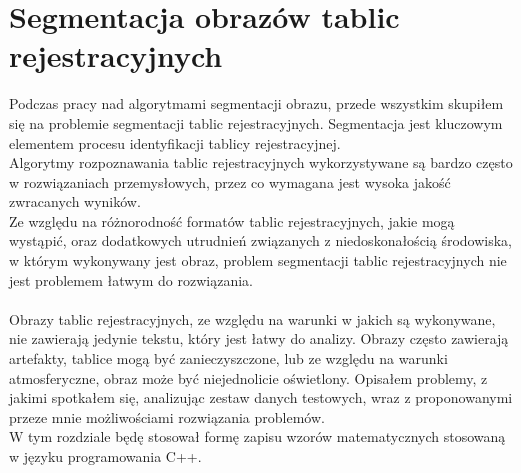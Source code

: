 \section{Segmentacja obrazów tablic rejestracyjnych}
Podczas pracy nad algorytmami segmentacji obrazu, przede wszystkim skupiłem się na problemie segmentacji tablic rejestracyjnych. Segmentacja jest kluczowym elementem procesu identyfikacji tablicy rejestracyjnej.\\
Algorytmy rozpoznawania tablic rejestracyjnych wykorzystywane są bardzo często w rozwiązaniach przemysłowych, przez co wymagana jest wysoka jakość zwracanych wyników.\\
Ze względu na różnorodność formatów tablic rejestracyjnych, jakie mogą wystąpić, oraz dodatkowych utrudnień związanych z niedoskonałością środowiska, w którym wykonywany jest obraz, problem segmentacji tablic rejestracyjnych nie jest problemem łatwym do rozwiązania.
\paragraph{}
Obrazy tablic rejestracyjnych, ze względu na warunki w jakich są wykonywane, nie zawierają jedynie tekstu, który jest łatwy do analizy. Obrazy często zawierają artefakty, tablice mogą być zanieczyszczone, lub ze względu na warunki atmosferyczne, obraz może być niejednolicie oświetlony. Opisałem problemy, z jakimi spotkałem się, analizując zestaw danych testowych, wraz z proponowanymi przeze mnie możliwościami rozwiązania problemów.\\
W tym rozdziale będę stosował formę zapisu wzorów matematycznych stosowaną w języku programowania C++.
